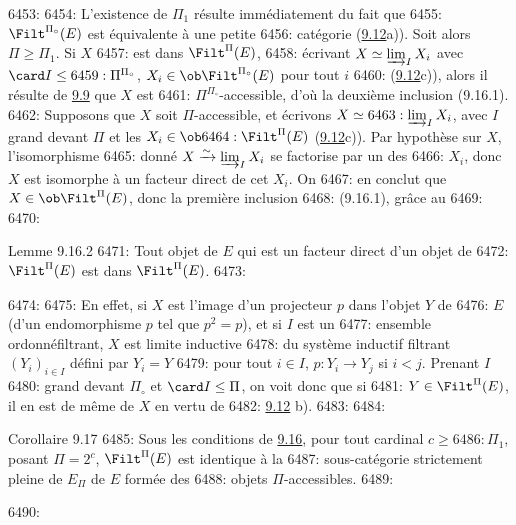 6453: 
6454: L'existence de $\Pi_1$ résulte immédiatement du fait que
6455: $\Filt^{\Pi_\circ}(E)$ est équivalente à une petite
6456: catégorie (\hyperref[I.def9.12]{9.12}a)). Soit alors $\Pi\geq \Pi_1$. Si $X$
6457:   est dans $\Filt^{\Pi}(E)$,
6458: écrivant $X\simeq \varinjlim_I X_i$ avec $\card I\leq
6459: \Pi^{\Pi_\circ}$, $X_i\in \ob \Filt^{\Pi_\circ}(E)$ pour tout $i$
6460: (\hyperref[I.def9.12]{9.12}c)), alors il résulte de \hyperref[I.cor9.9]{9.9} que $X$ est
6461: $\Pi^{\Pi_\circ}$-accessible, d'où la deuxième inclusion (9.16.1).
6462: Supposons que $X$ soit $\Pi$-accessible, et écrivons $X\simeq
6463: \varinjlim_I X_i$, avec $I$ grand devant $\Pi$ et les $X_i\in \ob
6464: \Filt^{\Pi}(E)$ (\hyperref[I.def9.12]{9.12}c)). Par hypothèse sur $X$, l'isomorphisme
6465: donné $X\xrightarrow{\sim} \varinjlim_I X_i$ se factorise par un des
6466: $X_i$, donc $X$ est isomorphe à un facteur direct de cet $X_i$. On
6467: en conclut que $X\in \ob \Filt^{\Pi}(E)$, donc la première inclusion
6468: (9.16.1), grâce au
6469: 
6470: \begin{enonce*}{Lemme 9.16.2}
6471: Tout objet de $E$ qui est un facteur direct d'un objet de
6472: $\Filt^{\Pi}(E)$ est dans $\Filt^{\Pi}(E)$.
6473: \end{enonce*}
6474: 
6475: En effet, si $X$ est l'image d'un projecteur $p$ dans l'objet $Y$ de
6476: $E$ (\ie d'un endomorphisme $p$ tel que $p^2=p$), et si $I$ est un
6477: ensemble ordonné\pageoriginale  filtrant, $X$ est limite inductive
6478: du système inductif filtrant $(Y_i)_{i\in I}$ défini par $Y_i=Y$
6479: pour tout $i\in I$, $p:Y_i\rightarrow Y_j$ si $i<j$. Prenant $I$
6480: grand devant $\Pi_\circ$ et $\card I\leq \Pi$, on voit donc que si
6481: $Y\in \Filt^{\Pi}(E)$, il en est de même de $X$ en vertu de
6482: \hyperref[I.def9.12]{9.12} b).
6483: 
6484: \begin{enonce*}{Corollaire 9.17}
6485: Sous les conditions de \hyperref[I.prop9.16]{9.16}, pour tout cardinal $c\geq
6486: \Pi_1$, posant $\Pi=2^c$, $\Filt^{\Pi}(E)$ est identique à la
6487: sous-catégorie strictement pleine de $E_{\Pi}$ de $E$ formée des
6488: objets $\Pi$-accessibles.
6489: \end{enonce*}
6490: 

